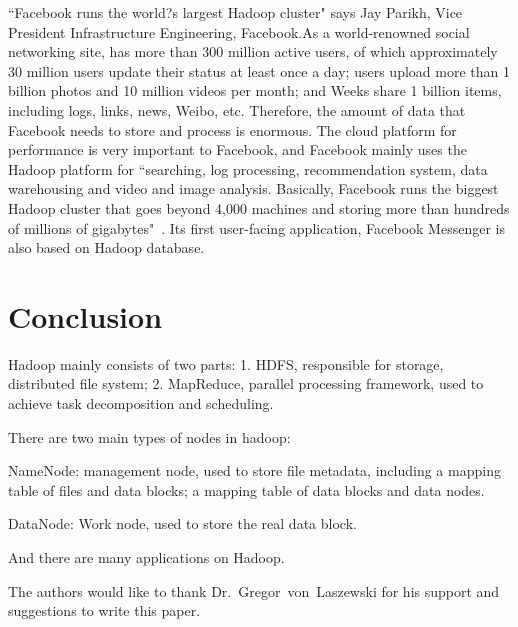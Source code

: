 ``Facebook runs the world?s largest Hadoop cluster" says Jay Parikh, Vice President Infrastructure Engineering, Facebook.As a world-renowned social networking site, has more than 300 million active users, of which approximately 30 million users update their status at least once a day; users upload more than 1 billion photos and 10 million videos per month; and Weeks share 1 billion items, including logs, links, news, Weibo, etc. Therefore, the amount of data that Facebook needs to store and process is enormous. The cloud platform for performance is very important to Facebook, and Facebook mainly uses the Hadoop platform for ``searching, log processing, recommendation system, data warehousing and video and image analysis. Basically, Facebook runs the biggest Hadoop cluster that goes beyond 4,000 machines and storing more than hundreds of millions of gigabytes"~\cite{hid-sp18-508-fb}. Its first user-facing application, Facebook Messenger is also based on Hadoop database.



\section{Conclusion}
Hadoop mainly consists of two parts: 1. HDFS, responsible for storage, distributed file system; 2. MapReduce, parallel processing framework, used to achieve task decomposition and scheduling. 

There are two main types of nodes in hadoop:

NameNode: management node, used to store file metadata, including a mapping table of files and data blocks; a mapping table of data blocks and data nodes.

DataNode: Work node, used to store the real data block.

And there are many applications on Hadoop.

\begin{acks}

  The authors would like to thank Dr.~Gregor~von~Laszewski for his
  support and suggestions to write this paper.

\end{acks}


 

